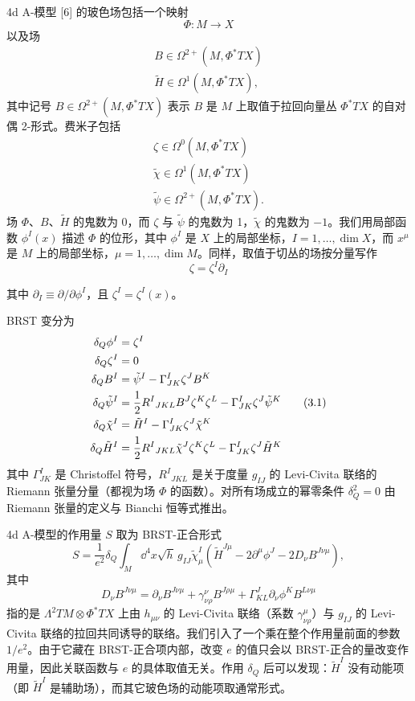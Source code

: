 4d A-模型 [6] 的玻色场包括一个映射
\[
  \Phi:M\to X
\]
以及场
\begin{gather*}
  B\in\Omega^{2+}(M,\Phi^*TX)\\
  \tilde H\in\Omega^1(M,\Phi^*TX),
\end{gather*}
其中记号 $B\in\Omega^{2+}(M,\Phi^*TX)$ 表示 $B$ 是 $M$ 上取值于拉回向量丛 $\Phi^*TX$ 的自对偶 2-形式。费米子包括
\begin{gather*}
  \zeta\in\Omega^0(M,\Phi^*TX)\\
  \tilde\chi\in\Omega^1(M,\Phi^*TX)\\
  \tilde\psi\in\Omega^{2+}(M,\Phi^*TX).
\end{gather*}
场 $\Phi$、$B$、$\tilde H$ 的鬼数为 0，而 $\zeta$ 与 $\tilde\psi$ 的鬼数为 1，$\tilde\chi$ 的鬼数为 $-1$。我们用局部函数 $\phi^I(x)$ 描述 $\Phi$ 的位形，其中 $\phi^I$ 是 $X$ 上的局部坐标，$I=1,\ldots,\dim X$，而 $x^\mu$ 是 $M$ 上的局部坐标，$\mu=1,\ldots,\dim M$。同样，取值于切丛的场按分量写作
\[
  \zeta=\zeta^I\partial_I
\]

其中 $\partial_I\equiv\partial/\partial\phi^I$，且 $\zeta^I=\zeta^I(x)$。

BRST 变分为
\begin{align}
  \delta_Q\phi^I &= \zeta^I \notag\\
  \delta_Q\zeta^I &= 0 \notag\\
  \delta_QB^I &= \tilde\psi^I-\Gamma^I_{JK}\zeta^JB^K \notag\\
  \delta_Q\tilde\psi^I &= \frac12R^I{}_{JKL}B^J\zeta^K\zeta^L-\Gamma^I_{JK}\zeta^J\tilde\psi^K \tag{3.1}\\
  \delta_Q\tilde\chi^I &= \tilde H^I-\Gamma^I_{JK}\zeta^J\tilde\chi^K \notag\\
  \delta_Q\tilde H^I &= \frac12R^I{}_{JKL}\tilde\chi^J\zeta^K\zeta^L-\Gamma^I_{JK}\zeta^J\tilde H^K \notag
\end{align}
其中 $\Gamma^I_{JK}$ 是 Christoffel 符号，$R^I{}_{JKL}$ 是关于度量 $g_{IJ}$ 的 Levi-Civita 联络的 Riemann 张量分量（都视为场 $\Phi$ 的函数）。对所有场成立的幂零条件 $\delta_Q^2=0$ 由 Riemann 张量的定义与 Bianchi 恒等式推出。

4d A-模型的作用量 $S$ 取为 BRST-正合形式
\[
  S=\frac{1}{e^2}\delta_Q\int_M \dd^4x\sqrt{h}\,g_{IJ}\tilde\chi^I_\mu\left(\tilde H^{J\mu}-2\partial^\mu\phi^J-2D_\nu B^{J\nu\mu}\right),
\]
其中
\[
  D_\nu B^{J\nu\mu}=\partial_\nu B^{J\nu\mu}+\gamma^\nu_{\nu\rho}B^{J\rho\mu}+\Gamma^J_{KL}\partial_\nu\phi^KB^{L\nu\mu}
\]
指的是 $\Lambda^2TM\otimes\Phi^*TX$ 上由 $h_{\mu\nu}$ 的 Levi-Civita 联络（系数 $\gamma^\mu_{\nu\rho}$）与 $g_{IJ}$ 的 Levi-Civita 联络的拉回共同诱导的联络。我们引入了一个乘在整个作用量前面的参数 $1/e^2$。由于它藏在 BRST-正合项内部，改变 $e$ 的值只会以 BRST-正合的量改变作用量，因此关联函数与 $e$ 的具体取值无关。作用 $\delta_Q$ 后可以发现：$\tilde H^I$ 没有动能项（即 $\tilde H^I$ 是辅助场），而其它玻色场的动能项取通常形式。

